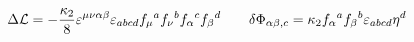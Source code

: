 \begin{equation}
\Delta {\cal L} = - \frac{\kappa_2}{8} \varepsilon^{\mu\nu\alpha\beta}
\varepsilon_{abcd} f_\mu{}^a f_\nu{}^b f_\alpha{}^c f_\beta{}^d \qquad
\delta \Phi_{\alpha\beta,c} = \kappa_2 f_\alpha{}^a f_\beta{}^b
\varepsilon_{abcd} \eta^d
\end{equation}

